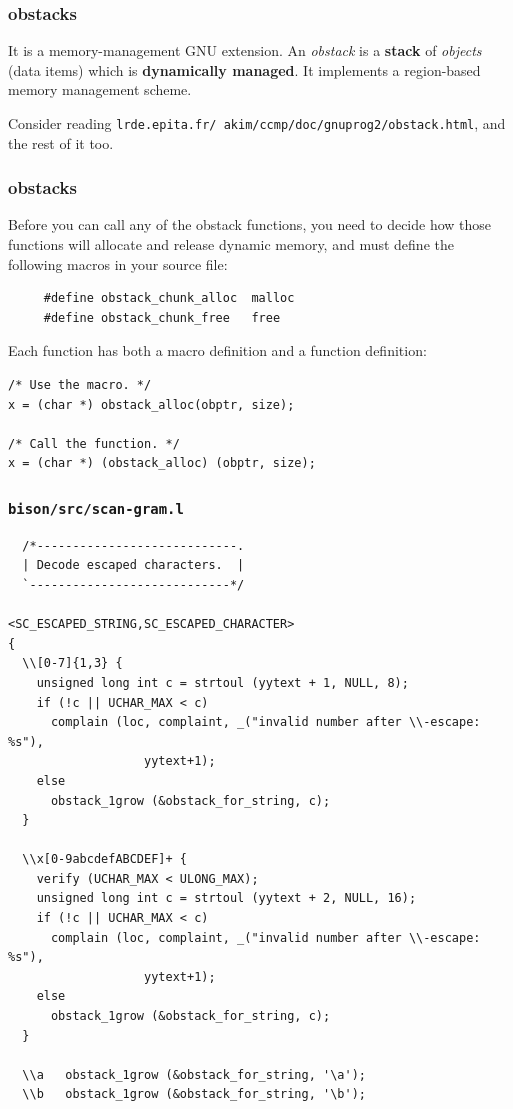 \documentclass{beamer}
\begin{document}
\begin{frame}
  \frametitle{obstacks}
It is a memory-management GNU extension. An \textit{obstack} is a
\textbf{stack} of \textit{objects} (data items) which is \textbf{dynamically
managed}. It implements a region-based memory management scheme.

\vfill

Consider reading
\texttt{lrde.epita.fr/~akim/ccmp/doc/gnuprog2/obstack.html}, and
the rest of it too.
\end{frame}

\begin{frame}[fragile]
  \frametitle{obstacks}

Before you can call any of the obstack functions, you need to decide how those
functions will allocate and release dynamic memory, and must define the
following macros in your source file:

\begin{verbatim}
     #define obstack_chunk_alloc  malloc
     #define obstack_chunk_free   free
\end{verbatim}

\vfill

Each function has both a macro definition and a function definition:

\begin{verbatim}
/* Use the macro. */
x = (char *) obstack_alloc(obptr, size);

/* Call the function. */
x = (char *) (obstack_alloc) (obptr, size);
\end{verbatim}
\end{frame}

\begin{frame}[fragile,shrink=25]
  \frametitle{\texttt{bison/src/scan-gram.l}}
\begin{verbatim}
  /*----------------------------.
  | Decode escaped characters.  |
  `----------------------------*/

<SC_ESCAPED_STRING,SC_ESCAPED_CHARACTER>
{
  \\[0-7]{1,3} {
    unsigned long int c = strtoul (yytext + 1, NULL, 8);
    if (!c || UCHAR_MAX < c)
      complain (loc, complaint, _("invalid number after \\-escape: %s"),
                   yytext+1);
    else
      obstack_1grow (&obstack_for_string, c);
  }

  \\x[0-9abcdefABCDEF]+ {
    verify (UCHAR_MAX < ULONG_MAX);
    unsigned long int c = strtoul (yytext + 2, NULL, 16);
    if (!c || UCHAR_MAX < c)
      complain (loc, complaint, _("invalid number after \\-escape: %s"),
                   yytext+1);
    else
      obstack_1grow (&obstack_for_string, c);
  }

  \\a   obstack_1grow (&obstack_for_string, '\a');
  \\b   obstack_1grow (&obstack_for_string, '\b');
\end{verbatim}
\end{frame}
\end{document}
